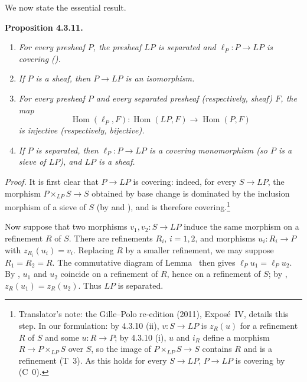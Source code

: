 We now state the essential result.

\medskip
\noindent{}\textbf{Proposition 4.3.11.}
\begin{enumerate}
 \item[(i)] \textit{For every presheaf \(P\), the presheaf \(LP\) is
 separated and \(\ell_P:P\to LP\) is covering ().}
 \item[(ii)] \textit{If \(P\) is a sheaf, then \(P\to LP\) is an
 isomorphism.}
 \item[(iii)] \textit{For every presheaf \(P\) and every separated
 presheaf (respectively, sheaf) \(F\), the map}
 \[
  \operatorname{Hom}(\ell_P,F):
  \operatorname{Hom}(LP,F)\longrightarrow\operatorname{Hom}(P,F)
 \]
 \textit{is injective (respectively, bijective).}
 \item[(iv)] \textit{If \(P\) is separated, then
 \(\ell_P:P\to LP\) is a covering monomorphism (so \(P\) is a sieve
 of \(LP\)), and \(LP\) is a sheaf.}
\end{enumerate}

\noindent\textit{Proof.}
 It is first clear that \(P\to LP\) is covering: indeed, for every
\(S\to LP\), the morphism \(P\times_{LP}S\to S\) obtained by base change is
dominated by the inclusion morphism of a sieve of \(S\) (by
 and ), and is therefore covering.\footnote{Translator's note: the Gille--Polo re-edition (2011), Expos\'e~IV, details
this step. In our formulation: by 4.3.10 (ii), \(v\colon S\to LP\) is
\(z_R(u)\) for a refinement \(R\) of \(S\) and some \(u\colon R\to P\); by
4.3.10 (i), \(u\) and \(i_R\) define a morphism \(R\to P\times_{LP}S\) over
\(S\), so the image of \(P\times_{LP}S\to S\) contains \(R\) and is a
refinement (T~3). As this holds for every \(S\to LP\), \(P\to LP\) is covering
by (C~0).}

Now suppose that two morphisms \(v_1,v_2:S\to LP\) induce the same
morphism on a refinement \(R\) of \(S\). There are refinements \(R_i\),
\(i=1,2\), and morphisms \(u_i:R_i\to P\) with
\(z_{R_i}(u_i)=v_i\). Replacing \(R\) by a smaller refinement, we may
suppose \(R_1=R_2=R\). The commutative diagram of Lemma~ then
gives \(\ell_Pu_1=\ell_Pu_2\). By , \(u_1\) and \(u_2\)
coincide on a refinement of \(R\), hence on a refinement of \(S\); by
, \(z_R(u_1)=z_R(u_2)\). Thus \(LP\) is separated.

